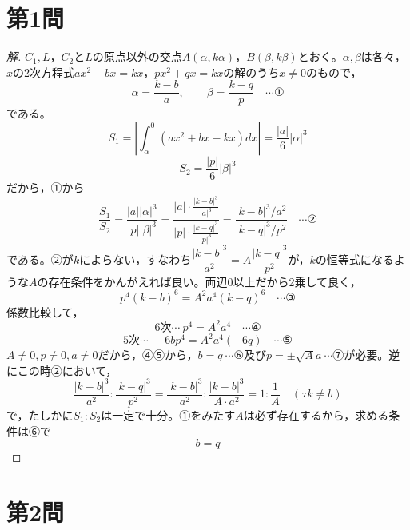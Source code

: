 \documentclass[../main.tex]{subfiles}
\begin{document}
\section*{第1問}

\begin{proof}[解]
  $C_1,L$，$C_2$と$L$の原点以外の交点$A(\alpha,k\alpha)$，$B(\beta,k\beta)$とおく。$\alpha,\beta$は各々，$x$の2次方程式$ax^2+bx=kx$，$px^2+qx=kx$の解のうち$x\ne0$のもので，
  \[
    \alpha=\frac{k-b}{a}, \qquad \beta=\frac{k-q}{p} \quad\cdots\text{①}
  \]
  である。
  \[
    S_1=\left|\int_\alpha^0(ax^2+bx-kx)dx\right|=\frac{|a|}{6}|\alpha|^3
  \]
  \[
    S_2=\frac{|p|}{6}|\beta|^3
  \]
  だから，①から
  \[
    \frac{S_1}{S_2}=\frac{|a||\alpha|^3}{|p||\beta|^3}=\frac{|a|\cdot\frac{|k-b|^3}{|a|^3}}{|p|\cdot\frac{|k-q|^3}{|p|^3}}=\frac{|k-b|^3/a^2}{|k-q|^3/p^2} \quad\cdots\text{②}
  \]
  である。②が$k$によらない，すなわち$\dfrac{|k-b|^3}{a^2}=A\dfrac{|k-q|^3}{p^2}$が，$k$の恒等式になるような$A$の存在条件をかんがえれば良い。両辺0以上だから2乗して良く，
  \[
    p^4(k-b)^6=A^2a^4(k-q)^6 \quad\cdots\text{③}
  \]
  係数比較して，
  \[
    6\text{次}\cdots\ p^4=A^2a^4 \quad\cdots\text{④}
  \]
  \[
    5\text{次}\cdots\ -6bp^4=A^2a^4(-6q) \quad\cdots\text{⑤}
  \]
  $A\ne0,p\ne0,a\ne0$だから，④⑤から，$b=q\ \cdots$⑥及び$p=\pm\sqrt Aa\ \cdots$⑦が必要。逆にこの時②において，
  \[
    \frac{|k-b|^3}{a^2}:\frac{|k-q|^3}{p^2}=\frac{|k-b|^3}{a^2}:\frac{|k-b|^3}{A\cdot a^2}=1:\frac1A \quad(\because k\ne b)
  \]
  で，たしかに$S_1:S_2$は一定で十分。①をみたす$A$は必ず存在するから，求める条件は⑥で
  \[
    b=q
  \]
\end{proof}

\newpage

\section*{第2問}
\end{document}
